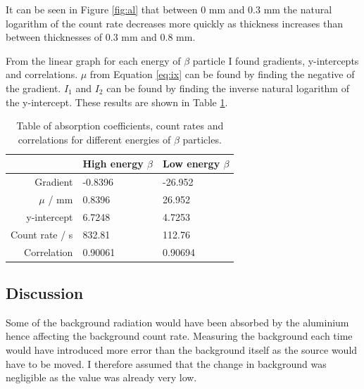 \documentclass[twocolumn]{revtex4-1}
\begin{document}
It can be seen in Figure \ref{fig:al} that between 0 mm and 0.3 mm the natural logarithm of the count rate decreases more quickly as thickness increases than between thicknesses of 0.3 mm and 0.8 mm.

From the linear graph for each energy of $\beta$ particle I found gradients, y-intercepts and correlations.
$\mu$ from Equation \ref{eq:ix} can be found by finding the negative of the gradient. 
$I_{1}$ and $I_{2}$ can be found by finding the inverse natural logarithm of the y-intercept.
These results are shown in Table \ref{table:ix}.

\vspace{0ex}

\begin{table}[!h]
\centering
\begin{tabular}{|r|l|l|}
\hline
\multicolumn{1}{|l|}{} & {High energy $\beta$} & {Low energy $\beta$} \\ \hline
{Gradient}            & {-0.8396}                       & {-26.952}                      \\
{$\mu$ / mm}       & {0.8396}                        & {26.952}                       \\ \hline
{y-intercept}         & {6.7248}                        & {4.7253}                       \\
{Count rate / s}    & {832.81}                        & {112.76}                       \\ \hline
{Correlation}    & {0.90061}                        & {0.90694}                       \\ \hline
\end{tabular}
\caption{Table of absorption coefficients, count rates and correlations for different energies of $\beta$ particles.}
\label{table:ix}
\end{table}

\vspace{-2ex}
\subsection{Discussion} 
\vspace{-3ex}

Some of the background radiation would have been absorbed by the aluminium hence affecting the background count rate.
Measuring the background each time would have introduced more error than the background itself as the source would have to be moved.
I therefore assumed that the change in background was negligible as the value was already very low.
\end{document}
